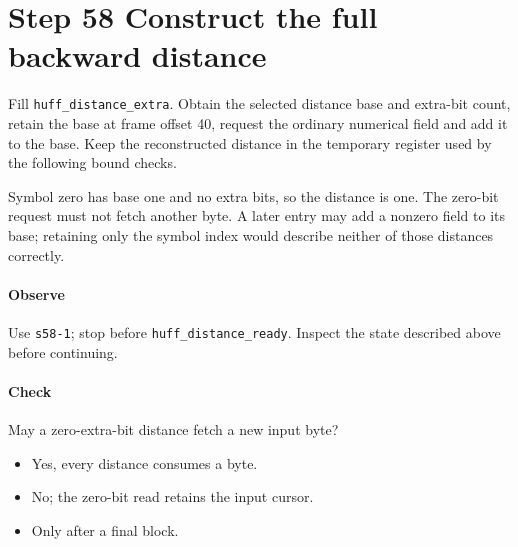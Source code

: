 \section{Step 58 Construct the full backward distance}\label{png-huff-s58}
Fill \texttt{huff\_distance\_extra}. Obtain the selected distance base and extra-bit count, retain the base at frame offset 40, request the ordinary numerical field and add it to the base. Keep the reconstructed distance in the temporary register used by the following bound checks.

Symbol zero has base one and no extra bits, so the distance is one. The zero-bit request must not fetch another byte. A later entry may add a nonzero field to its base; retaining only the symbol index would describe neither of those distances correctly.

\paragraph{Observe} Use \texttt{s58-1}; stop before \texttt{huff\_distance\_ready}. Inspect the state described above before continuing.

\paragraph{Check} May a zero-extra-bit distance fetch a new input byte?
\begin{itemize}
  \item[A.] Yes, every distance consumes a byte.
  \item[B.] No; the zero-bit read retains the input cursor.
  \item[C.] Only after a final block.
\end{itemize}
